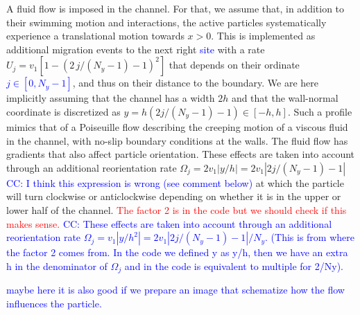 \documentclass[aps,prl,twocolumn,amsmath,amssymb,superscriptaddress]{revtex4-1}
\newcommand{\obs}[1]{\textcolor{red}{#1}}
\newcommand{\CC}[1]
{\textcolor{blue}{#1}}
\begin{document}
A fluid flow is imposed in the channel. For that, we assume that, in addition to their swimming motion and interactions, the active particles systematically experience a translational motion towards $x>0$. This is implemented as additional migration events to the next right \CC{site} with a rate $U_j = v_1[1-(2\,j/(N_y-1)-1)^2]$ that depends on their ordinate \CC{$j \in [0,N_y-1]$}, and thus on their distance to the boundary. We are here implicitly assuming that the channel has a width $2h$ and that the wall-normal coordinate is discretized as $y = h(2j/(N_y-1)-1)\in[-h,h]$. Such a profile mimics that of a Poiseuille flow describing the creeping motion of a viscous fluid in the channel, with no-slip boundary conditions at the walls. The fluid flow has gradients that also affect particle orientation. These effects are taken into account through an additional reorientation rate $\Omega_j = 2v_1 |y/h| = 2v_1|2j/(N_y-1)-1|$ \CC{CC: I think this expression is wrong (see comment below)} at which the particle will turn clockwise or anticlockwise depending on whether it is in the upper or lower half of the channel. \obs{The factor 2 is in the code but we should check if this makes sense.} 
\CC{CC: These effects are taken into account through an additional reorientation rate $\Omega_j = v_1 |y/h^2| = 2v_1|2j/(N_y-1)-1|/N_y$. (This is from where the factor 2 comes from. In the code we defined y as y/h, then we have an extra h in the denominator of $\Omega_j$ and in the code is equivalent to multiple for 2/Ny).}

\CC{maybe here it is also good if we prepare an image that schematize how the flow influences the particle.}
\end{document}
